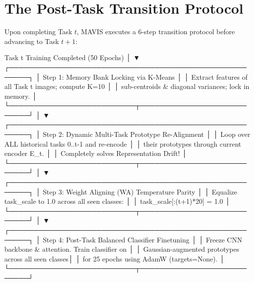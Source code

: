 \documentclass[11pt,a4paper]{article}
\begin{document}
\newpage

\section{The Post-Task Transition Protocol}
\label{sec:transition}

Upon completing Task $t$, MAVIS executes a 6-step transition protocol before advancing to Task $t+1$:

\begin{diagrambox}
                       Task t Training Completed (50 Epochs)
                                        │
                                        ▼
             ┌──────────────────────────────────────────────────────┐
             │ Step 1: Memory Bank Locking via K-Means              │
             │ Extract features of all Task t images; compute K=10  │
             │ sub-centroids & diagonal variances; lock in memory.  │
             └──────────────────────────┬───────────────────────────┘
                                        │
                                        ▼
             ┌──────────────────────────────────────────────────────┐
             │ Step 2: Dynamic Multi-Task Prototype Re-Alignment    │
             │ Loop over ALL historical tasks 0..t-1 and re-encode  │
             │ their prototypes through current encoder E_t.        │
             │ Completely solves Representation Drift!              │
             └──────────────────────────┬───────────────────────────┘
                                        │
                                        ▼
             ┌──────────────────────────────────────────────────────┐
             │ Step 3: Weight Aligning (WA) Temperature Parity      │
             │ Equalize task_scale to 1.0 across all seen classes:  │
             │ task_scale[:(t+1)*20] = 1.0                          │
             └──────────────────────────┬───────────────────────────┘
                                        │
                                        ▼
             ┌──────────────────────────────────────────────────────┐
             │ Step 4: Post-Task Balanced Classifier Finetuning     │
             │ Freeze CNN backbone & attention. Train classifier on │
             │ Gaussian-augmented prototypes across all seen classes│
             │ for 25 epochs using AdamW (targets=None).            │
             └──────────────────────────┬───────────────────────────┘

\end{diagrambox}
\end{document}
